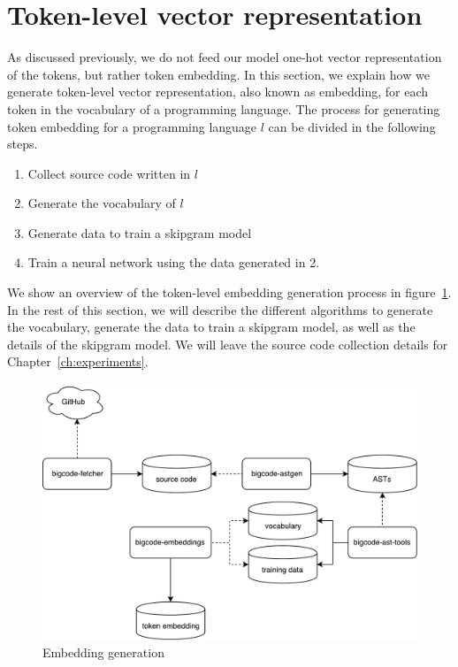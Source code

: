 \section{\label{sec:token-representation}Token-level vector representation}
As discussed previously, we do not feed our model one-hot vector representation
of the tokens, but rather token embedding. In this section, we explain how we
generate token-level vector representation, also known as embedding, for each
token in the vocabulary of a programming language. The process for generating
token embedding for a programming language $l$ can be divided in the following
steps.
\begin{enumerate}
\item Collect source code written in $l$
\item Generate the vocabulary of $l$
\item Generate data to train a skipgram model
\item Train a neural network using the data generated in 2.
\end{enumerate}
We show an overview of the token-level embedding generation process in
figure~\ref{fig:embedding-generation}. In the rest of this section, we will
describe the different algorithms to generate the vocabulary, generate the data
to train a skipgram model, as well as the details of the skipgram model. We will
leave the source code collection details for Chapter~\ref{ch:experiments}.

\begin{figure}
  \centering\includegraphics[width=14cm]{images/embedding-generation.pdf}
  \caption{\label{fig:embedding-generation} Embedding generation}
\end{figure}
%
